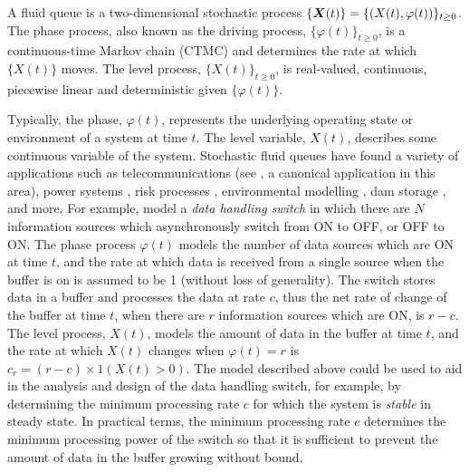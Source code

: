 		

A fluid queue is a two-dimensional stochastic process \(\{{\boldsymbol X}(t)\} = \{( X(t),\varphi(t))\}_{t\geq0}\). The phase process, also known as the driving process, \(\{\varphi(t)\}_{t\geq0}\), is a continuous-time Markov chain (CTMC) and determines the rate at which \(\{ X(t)\}\) moves. The level process, \(\{ X(t)\}_{t\geq0}\), is real-valued, continuous, piecewise linear and deterministic given \(\{\varphi(t)\}\). 

Typically, the phase, \(\varphi(t)\), represents the underlying operating state or environment of a system at time \(t\). The level variable, \(X(t)\), describes some continuous variable of the system. Stochastic fluid queues have found a variety of applications such as telecommunications (see \cite{anick1982}, a canonical application in this area), power systems \citep{hydro}, risk processes \citep{betal2005}, environmental modelling \citep{wurm2020}, dam storage \citep{loynes1962}, and more. For example, \cite{anick1982} model a \emph{data handling switch} in which there are \(N\) information sources which asynchronously switch from ON to OFF, or OFF to ON. The phase process \(\varphi(t)\) models the number of data sources which are ON at time \(t\), and the rate at which data is received from a single source when the buffer is on is assumed to be 1 (without loss of generality). The switch stores data in a buffer and processes the data at rate \(c\), thus the net rate of change of the buffer at time \(t\), when there are \(r\) information sources which are ON, is \(r-c\). The level process, \(X(t)\), models the amount of data in the buffer at time \(t\), and the rate at which \(X(t)\) changes when \(\varphi(t)=r\) is \(c_r=(r-c)\times 1(X(t)>0)\). The model described above could be used to aid in the analysis and design of the data handling switch, for example, by determining the minimum processing rate \(c\) for which the system is \emph{stable} in steady state. In practical terms, the minimum processing rate \(c\) determines the minimum processing power of the switch so that it is sufficient to prevent the amount of data in the buffer growing without bound. 

